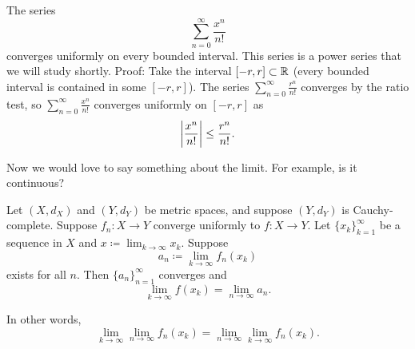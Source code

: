 \begin{example}
The series
\begin{equation*}
\sum_{n=0}^\infty \frac{x^n}{n!} 
\end{equation*}
converges uniformly on every bounded interval.
This series is a power series that we will study shortly.
Proof: Take the interval $[-r,r] \subset {\mathbb{R}}$ (every bounded interval
is contained in some $[-r,r]$).
The series $\sum_{n=0}^\infty \frac{r^n}{n!}$ converges by the ratio test,
so $\sum_{n=0}^\infty \frac{x^n}{n!}$ converges uniformly on $[-r,r]$ as
\begin{equation*}
\left\lvert {\frac{x^n}{n!} } \right\rvert \leq 
\frac{r^n}{n!} .
\end{equation*}
\end{example}

Now we would love to say something about the limit.  For example, is it
continuous?


\begin{prop} \label{prop:uniformswitch}
Let $(X,d_X)$ and $(Y,d_Y)$ be metric spaces, and suppose $(Y,d_Y)$ is
Cauchy-complete.
Suppose $f_n \colon X \to Y$ converge uniformly to
 $f \colon X \to Y$.  
Let $\{ x_k \}_{k=1}^\infty$ be a sequence in $X$ and $x \coloneqq \lim_{k \to \infty} x_k$.  Suppose
\begin{equation*}
a_n \coloneqq \lim_{k \to \infty} f_n(x_k)
\end{equation*}
exists for all $n$.  Then
$\{a_n\}_{n=1}^\infty$ converges and 
\begin{equation*}
\lim_{k \to \infty} f(x_k) = \lim_{n\to\infty} a_n .
\end{equation*}
\end{prop}

In other words,
\begin{equation*}
\lim_{k \to \infty} \lim_{n\to\infty} f_n(x_k) =
\lim_{n \to \infty} \lim_{k\to\infty} f_n(x_k) .
\end{equation*}

